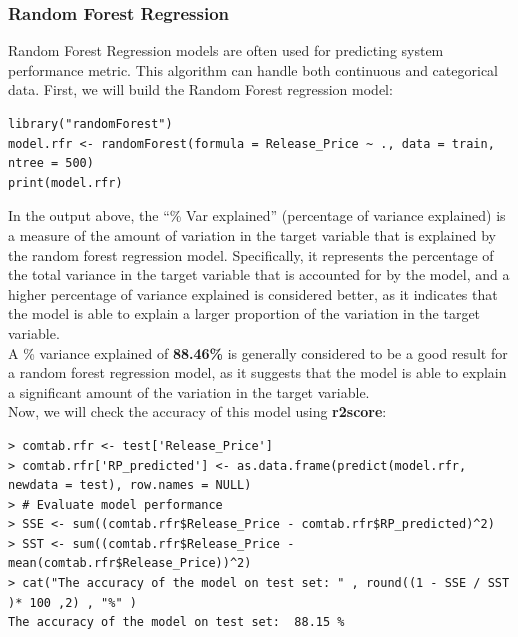 \documentclass[a4paper]{article}
\theoremstyle{definition}
\begin{document}
\subsubsection{Random Forest Regression}
Random Forest Regression models are often used for predicting system performance metric. This algorithm can handle both continuous and categorical data. First, we will build the Random Forest regression model:
\begin{mdframed}[leftline=false,rightline=false,backgroundcolor=lightblue!10,nobreak=false,numbers=false]
    \begin{verbatim}
library("randomForest")
model.rfr <- randomForest(formula = Release_Price ~ ., data = train, ntree = 500)
print(model.rfr)
\end{verbatim}
\end{mdframed}

In the output above, the “\% Var explained” (percentage of variance explained) is a measure of the amount of variation in the target variable that is explained by the random forest regression model. Specifically, it represents the percentage of the total variance in the target variable that is accounted for by the model, and a higher percentage of variance explained is considered better, as it indicates that the model is able to explain a larger proportion of the variation in the target variable.\\
A \% variance explained of \textbf{88.46\%} is generally considered to be a good result for a random forest regression model, as it suggests that the model is able to explain a significant amount of the variation in the target variable.\\
Now, we will check the accuracy of this model using \textbf{r2\textunderscore score}:
\begin{mdframed}[leftline=false,rightline=false,backgroundcolor=lightblue!10,nobreak=false,numbers=false]
    \begin{verbatim}
> comtab.rfr <- test['Release_Price']
> comtab.rfr['RP_predicted'] <- as.data.frame(predict(model.rfr, newdata = test), row.names = NULL)
> # Evaluate model performance
> SSE <- sum((comtab.rfr$Release_Price - comtab.rfr$RP_predicted)^2)
> SST <- sum((comtab.rfr$Release_Price - mean(comtab.rfr$Release_Price))^2)
> cat("The accuracy of the model on test set: " , round((1 - SSE / SST )* 100 ,2) , "%" )
The accuracy of the model on test set:  88.15 %
\end{verbatim}
\end{mdframed}
\end{document}
